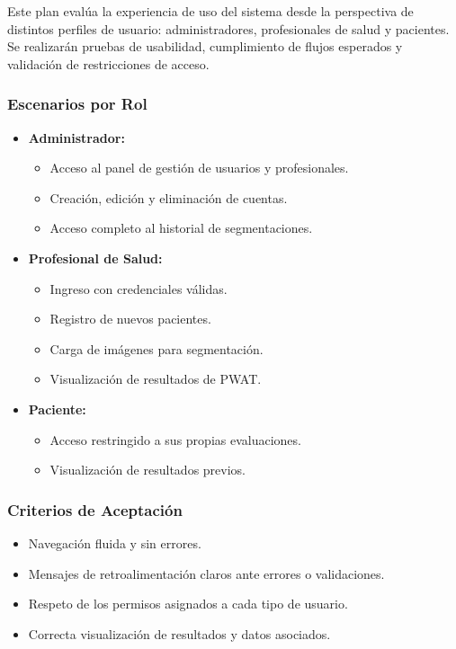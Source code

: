 Este plan evalúa la experiencia de uso del sistema desde la perspectiva de distintos perfiles de usuario: administradores, profesionales de salud y pacientes. Se realizarán pruebas de usabilidad, cumplimiento de flujos esperados y validación de restricciones de acceso.

\subsubsection{Escenarios por Rol}

\begin{itemize}
    \item \textbf{Administrador:}
    \begin{itemize}
        \item Acceso al panel de gestión de usuarios y profesionales.
        \item Creación, edición y eliminación de cuentas.
        \item Acceso completo al historial de segmentaciones.
    \end{itemize}
    
    \item \textbf{Profesional de Salud:}
    \begin{itemize}
        \item Ingreso con credenciales válidas.
        \item Registro de nuevos pacientes.
        \item Carga de imágenes para segmentación.
        \item Visualización de resultados de PWAT.
    \end{itemize}
    
    \item \textbf{Paciente:}
    \begin{itemize}
        \item Acceso restringido a sus propias evaluaciones.
        \item Visualización de resultados previos.
    \end{itemize}
\end{itemize}

\subsubsection{Criterios de Aceptación}

\begin{itemize}
    \item Navegación fluida y sin errores.
    \item Mensajes de retroalimentación claros ante errores o validaciones.
    \item Respeto de los permisos asignados a cada tipo de usuario.
    \item Correcta visualización de resultados y datos asociados.
\end{itemize}

